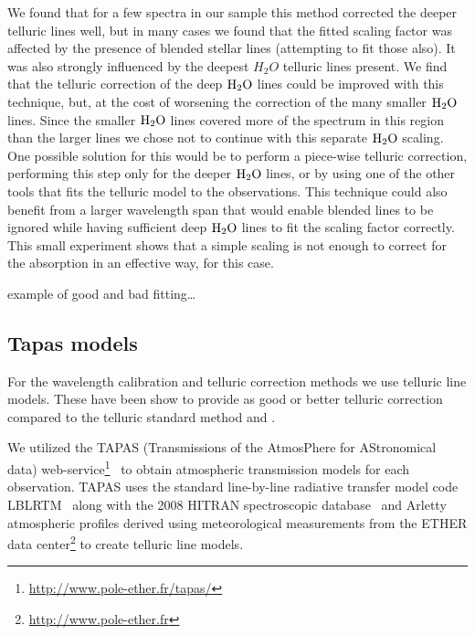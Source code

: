 We found that for a few spectra in our sample this method corrected the deeper telluric lines well, but in many cases we found that the fitted scaling factor was affected by the presence of blended stellar lines (attempting to fit those also). It was also strongly influenced by the deepest \(H_{2}O\) telluric lines present. We find that the telluric correction of the deep \(\rm H_{2}O \) lines could be improved with this technique, but, at the cost of worsening the correction of the many smaller \(\rm H_{2}O \) lines. Since the smaller \(\rm H_{2}O \) lines covered more of the spectrum in this region than the larger lines we chose not to continue with this separate \(\rm H_{2}O \) scaling. One possible solution for this would be to perform a piece-wise telluric correction, performing this step only for the deeper \( \rm H_{2}O\) lines, or by using one of the other tools that fits the telluric model to the observations. This technique could also benefit from a larger wavelength span that would enable blended lines to be ignored while having sufficient deep \(\rm H_{2}O\) lines to fit the scaling factor correctly. This small experiment shows that a simple scaling is not enough to correct for the absorption in an effective way, for this case.



 example of good and bad fitting\ldots


\subsection{Tapas models}
\label{subsec:tapas_models}
For the wavelength calibration and telluric correction methods we use telluric line models. These have been show to provide as good or better telluric correction compared to the telluric standard method and \citep{ulmer-moll_telluric_2018}.

We utilized the TAPAS (Transmissions of the AtmosPhere for AStronomical data) web-service\footnote{\url{http://www.pole-ether.fr/tapas/}}~\citep{bertaux_tapas_2014} to obtain atmospheric transmission models for each observation. TAPAS uses the standard line-by-line radiative transfer model code LBLRTM~\citep{clough_linebyline_1995} along with the 2008 HITRAN spectroscopic database~\citep{rothman_hitran_2009} and Arletty atmospheric profiles derived using meteorological measurements from the ETHER data center\footnote{\url{http://www.pole-ether.fr}} to create telluric line models.

